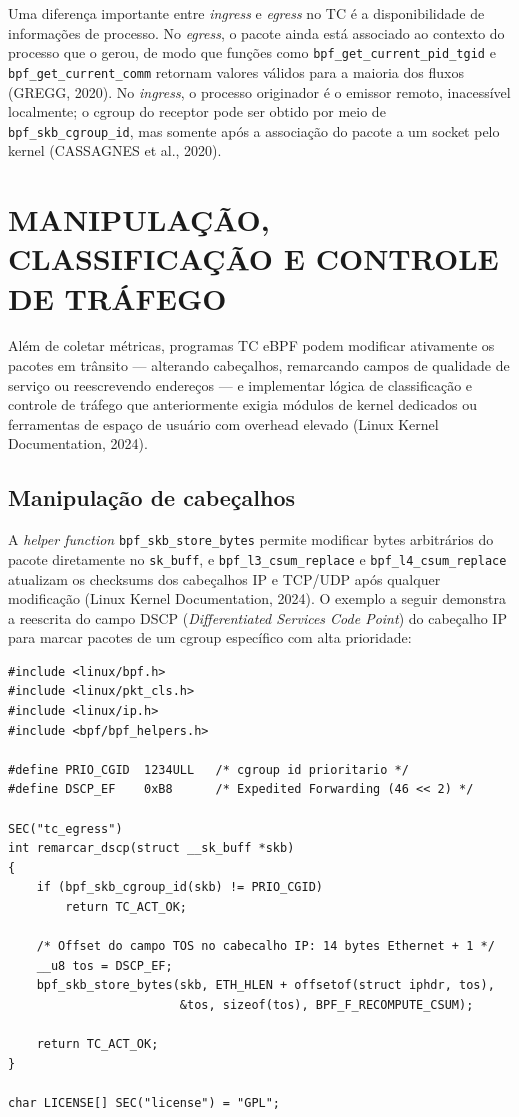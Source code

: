 Uma diferença importante entre \textit{ingress} e \textit{egress} no TC é a
disponibilidade de informações de processo. No \textit{egress}, o pacote ainda está
associado ao contexto do processo que o gerou, de modo que funções como
\texttt{bpf\_get\_current\_pid\_tgid} e \texttt{bpf\_get\_current\_comm} retornam
valores válidos para a maioria dos fluxos (GREGG, 2020). No \textit{ingress}, o
processo originador é o emissor remoto, inacessível localmente; o cgroup do receptor
pode ser obtido por meio de \texttt{bpf\_skb\_cgroup\_id}, mas somente após a associação
do pacote a um socket pelo kernel (CASSAGNES et al., 2020).

\section{MANIPULAÇÃO, CLASSIFICAÇÃO E CONTROLE DE TRÁFEGO}

Além de coletar métricas, programas TC eBPF podem modificar ativamente os pacotes
em trânsito — alterando cabeçalhos, remarcando campos de qualidade de serviço ou
reescrevendo endereços — e implementar lógica de classificação e controle de tráfego
que anteriormente exigia módulos de kernel dedicados ou ferramentas de espaço de
usuário com overhead elevado (Linux Kernel Documentation, 2024).

\subsection*{Manipulação de cabeçalhos}

A \textit{helper function} \texttt{bpf\_skb\_store\_bytes} permite modificar bytes
arbitrários do pacote diretamente no \texttt{sk\_buff}, e \texttt{bpf\_l3\_csum\_replace}
e \texttt{bpf\_l4\_csum\_replace} atualizam os checksums dos cabeçalhos IP e TCP/UDP
após qualquer modificação (Linux Kernel Documentation, 2024). O exemplo a seguir
demonstra a reescrita do campo DSCP (\textit{Differentiated Services Code Point}) do
cabeçalho IP para marcar pacotes de um cgroup específico com alta prioridade:

\begin{lstlisting}[caption={Remarcação de DSCP para pacotes de cgroup prioritário.}, label=lst:tc-dscp]
#include <linux/bpf.h>
#include <linux/pkt_cls.h>
#include <linux/ip.h>
#include <bpf/bpf_helpers.h>

#define PRIO_CGID  1234ULL   /* cgroup id prioritario */
#define DSCP_EF    0xB8      /* Expedited Forwarding (46 << 2) */

SEC("tc_egress")
int remarcar_dscp(struct __sk_buff *skb)
{
    if (bpf_skb_cgroup_id(skb) != PRIO_CGID)
        return TC_ACT_OK;

    /* Offset do campo TOS no cabecalho IP: 14 bytes Ethernet + 1 */
    __u8 tos = DSCP_EF;
    bpf_skb_store_bytes(skb, ETH_HLEN + offsetof(struct iphdr, tos),
                        &tos, sizeof(tos), BPF_F_RECOMPUTE_CSUM);

    return TC_ACT_OK;
}

char LICENSE[] SEC("license") = "GPL";
\end{lstlisting}

